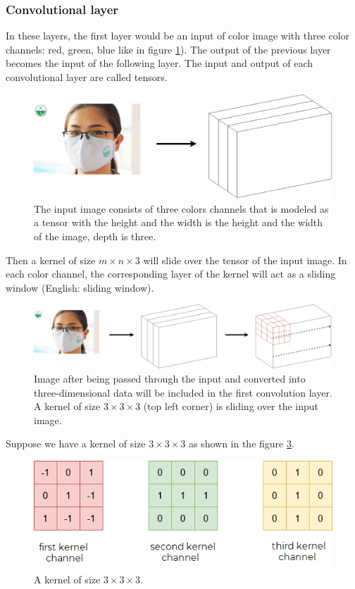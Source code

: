 \documentclass[conference]{IEEEtran}
\begin{document}
\subsubsection{Convolutional layer}
In these layers, the first layer would be an input of color image with three color channels: red, green, blue like in figure \ref{fig:image_convol_0}). The output of the previous layer becomes the input of the following layer. The input and output of each convolutional layer are called tensors.
\begin{figure}[ht!]
	\centerline{\includegraphics[scale=0.2]{images/image_convol_0.png}}
  	\caption{The input image consists of three colors channels that is modeled as a tensor with the height and the width is the height and the width of the image, depth is three.}
  	\label{fig:image_convol_0}
\end{figure}
Then a kernel of size $ m \times n \times 3 $ will slide over the tensor of the input image. In each color channel, the corresponding layer of the kernel will act as a sliding window (English: sliding window).
\begin{figure}[ht!]
	\centerline{\includegraphics[scale=0.15]{images/image_convol_1.png}}
  	\caption{Image after being passed through the input and converted into three-dimensional data will be included in the first convolution layer. A kernel of size $ 3 \times 3 \times 3 $ (top left corner) is sliding over the input image.}
  	\label{fig:image_convol_1}
\end{figure}
Suppose we have a kernel of size $ 3 \times 3 \times 3 $ as shown in the figure \ref{fig:kernel}.
\begin{figure}[ht!]
	\centerline{\includegraphics[scale=0.4]{images/kernel.png}}
  	\caption{A kernel of size $3 \times 3 \times 3$.}
  	\label{fig:kernel}
\end{figure}
\end{document}
